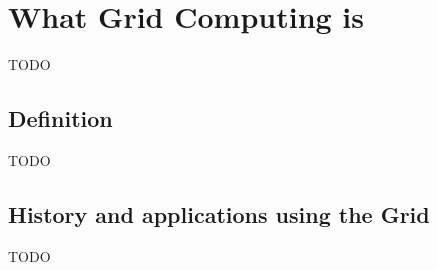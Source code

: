 \section{What Grid Computing is}
TODO

\subsection{Definition}
TODO

\subsection{History and applications using the Grid}
TODO
